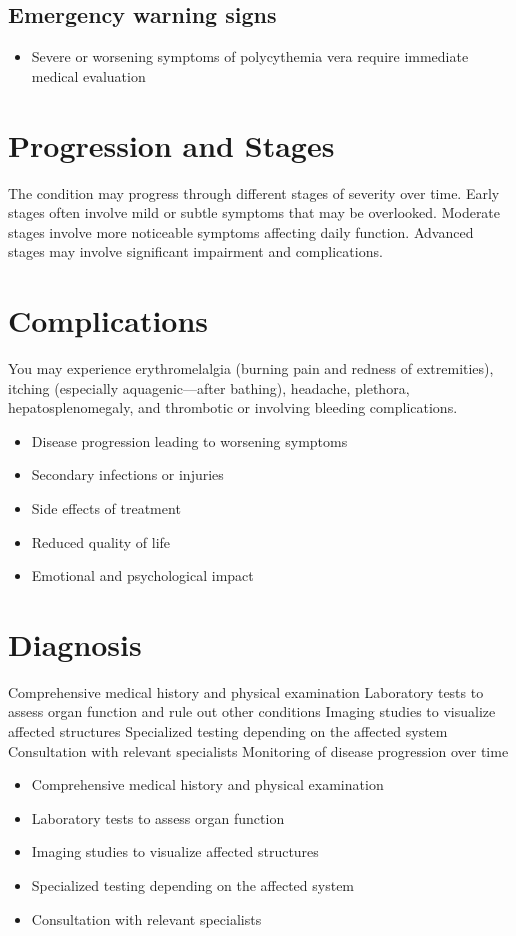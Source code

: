 \subsection{Emergency warning signs}
\begin{itemize}[noitemsep]
  \item Severe or worsening symptoms of polycythemia vera require immediate medical evaluation
\end{itemize}
\section{Progression and Stages}
The condition may progress through different stages of severity over time. Early stages often involve mild or subtle symptoms that may be overlooked. Moderate stages involve more noticeable symptoms affecting daily function. Advanced stages may involve significant impairment and complications.
\section{Complications}
You may experience erythromelalgia (burning pain and redness of extremities), itching (especially aquagenic---after bathing), headache, plethora, hepatosplenomegaly, and thrombotic or involving bleeding complications.

\begin{itemize}[noitemsep]
  \item Disease progression leading to worsening symptoms
  \item Secondary infections or injuries
  \item Side effects of treatment
  \item Reduced quality of life
  \item Emotional and psychological impact
\end{itemize}
\section{Diagnosis}
Comprehensive medical history and physical examination Laboratory tests to assess organ function and rule out other conditions Imaging studies to visualize affected structures Specialized testing depending on the affected system Consultation with relevant specialists Monitoring of disease progression over time

\begin{itemize}[noitemsep]
  \item Comprehensive medical history and physical examination
  \item Laboratory tests to assess organ function
  \item Imaging studies to visualize affected structures
  \item Specialized testing depending on the affected system
  \item Consultation with relevant specialists
\end{itemize}

